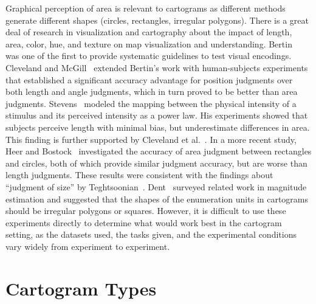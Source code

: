 \documentclass[10pt,journal,compsoc]{IEEEtran}
\begin{document}
Graphical perception of area is  relevant to cartograms as different methods generate different shapes (circles, rectangles, irregular polygons). 
There is a great deal of research in visualization and cartography about the impact of length, area, color, hue, and texture on map visualization and understanding.
Bertin~\cite{BERTIN83} was one of the first to provide systematic guidelines to test visual encodings.
Cleveland and McGill~\cite{cleveland1984graphical} extended Bertin's work with human-subjects experiments that established a significant accuracy advantage for position judgments over both length and angle judgments, which in turn proved to be better than area judgments. 
Stevens~\cite{Steven_law} modeled the mapping between the physical intensity of a stimulus and its perceived intensity as a power law. His experiments showed that subjects perceive length with minimal bias, but underestimate differences in area. This finding is further supported by Cleveland et al.~\cite{cleveland1982judgments}. In a more recent study, Heer and Bostock~\cite{JM10} investigated the accuracy of area judgment between rectangles and circles, both of which provide similar judgment accuracy, but are worse than length judgments. 
These results were consistent with the findings about  ``judgment of size'' by Teghtsoonian~\cite{teghtsoonian1965judgment}. Dent~\cite{dent1975} surveyed related work in magnitude estimation and suggested that the shapes of the enumeration units in cartograms should be irregular polygons or squares. 
However, it is difficult to use these experiments directly to determine what would work best in the cartogram setting, as the datasets used, the tasks given, and the experimental conditions vary widely from experiment to experiment.




\section{Cartogram Types}
\label{sec:types}
\end{document}
